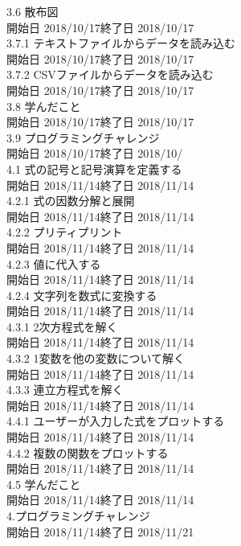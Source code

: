 \documentclass[12pt,a4paper]{jsarticle}
\begin{document}
\begin{tabbing}
3.6 散布図\\
\>開始日 2018/10/17\>終了日 2018/10/17\\
3.7.1 テキストファイルからデータを読み込む\\
\>開始日 2018/10/17\>終了日 2018/10/17\\
3.7.2 CSVファイルからデータを読み込む\\
\>開始日 2018/10/17\>終了日 2018/10/17\\
3.8 学んだこと\\
\>開始日 2018/10/17\>終了日 2018/10/17\\
3.9 プログラミングチャレンジ\\
\>開始日 2018/10/17\>終了日 2018/10/\\
4.1 式の記号と記号演算を定義する\\
\>開始日 2018/11/14\>終了日 2018/11/14\\
4.2.1 式の因数分解と展開\\
\>開始日 2018/11/14\>終了日 2018/11/14\\
4.2.2 プリティプリント\\
\>開始日 2018/11/14\>終了日 2018/11/14\\
4.2.3 値に代入する\\
\>開始日 2018/11/14\>終了日 2018/11/14\\
4.2.4 文字列を数式に変換する\\
\>開始日 2018/11/14\>終了日 2018/11/14\\
4.3.1 2次方程式を解く\\
\>開始日 2018/11/14\>終了日 2018/11/14\\
4.3.2 1変数を他の変数について解く\\
\>開始日 2018/11/14\>終了日 2018/11/14\\
4.3.3 連立方程式を解く\\
\>開始日 2018/11/14\>終了日 2018/11/14\\
4.4.1 ユーザーが入力した式をプロットする\\
\>開始日 2018/11/14\>終了日 2018/11/14\\
4.4.2 複数の関数をプロットする\\
\>開始日 2018/11/14\>終了日 2018/11/14\\
4.5 学んだこと\\
\>開始日 2018/11/14\>終了日 2018/11/14\\
4.プログラミングチャレンジ\\
\>開始日 2018/11/14\>終了日 2018/11/21
\end{tabbing}
\end{document}
